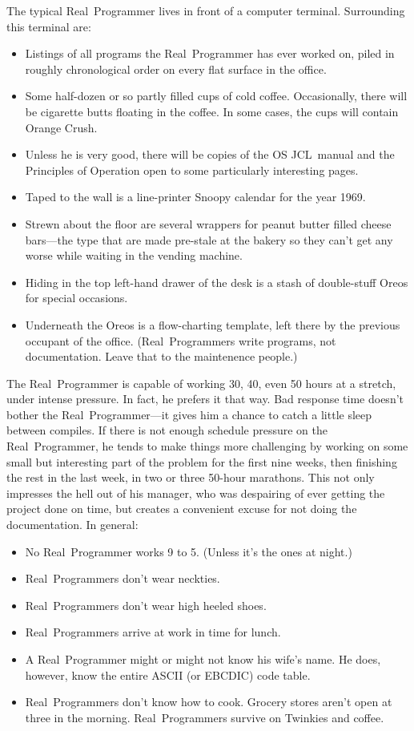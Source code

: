 \documentclass[10pt,letterpaper]{article}
\newcommand{\acro}[1]{{\small #1\spacefactor1000}}
\begin{document}
The typical Real~Programmer lives in front of a computer terminal. Surrounding this terminal are:
\begin{itemize}
\item Listings of all programs the Real~Programmer has ever worked on, piled in roughly chronological order on every flat surface in the office.
\item Some half-dozen or so partly filled cups of cold coffee. Occasionally, there will be cigarette butts floating in the coffee. In some cases, the cups will contain Orange Crush.
\item Unless he is very good, there will be copies of the \acro{OS JCL}~manual and the Principles of Operation open to some particularly interesting pages.
\item Taped to the wall is a line-printer Snoopy calendar for the year 1969.
\item Strewn about the floor are several wrappers for peanut butter filled cheese bars---the type that are made pre-stale at the bakery so they can't get any worse while waiting in the vending machine.
\item Hiding in the top left-hand drawer of the desk is a stash of double-stuff Oreos for special occasions.
\item Underneath the Oreos is a flow-charting template, left there by the previous occupant of the office. (Real~Programmers write programs, not documentation. Leave that to the maintenence people.)
\end{itemize}
The Real~Programmer is capable of working 30, 40, even 50 hours at a
stretch, under intense pressure. In fact, he prefers it that way. Bad
response time doesn't bother the Real~Programmer---it gives him a
chance to catch a little sleep between compiles. If there is not
enough schedule pressure on the Real~Programmer, he tends to make
things more challenging by working on some small but interesting part
of the problem for the first nine weeks, then finishing the rest in
the last week, in two or three 50-hour marathons. This not only
impresses the hell out of his manager, who was despairing of ever
getting the project done on time, but creates a convenient excuse for
not doing the documentation. In general:
\begin{itemize}
\item No Real~Programmer works 9 to 5. (Unless it's the ones at night.)
\item Real~Programmers don't wear neckties.
\item Real~Programmers don't wear high heeled shoes.
\item Real~Programmers arrive at work in time for lunch.
\item A Real~Programmer might or might not know his wife's name. He does, however, know the entire \acro{ASCII} (or \acro{EBCDIC}) code table.
\item Real~Programmers don't know how to cook. Grocery stores aren't open at three in the morning. Real~Programmers survive on Twinkies and coffee.
\end{itemize}
\end{document}
